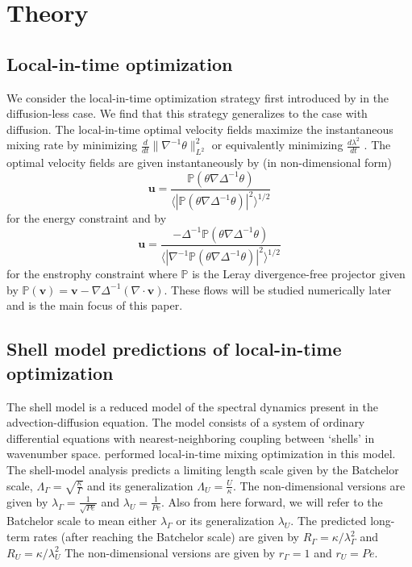 \documentclass[12pt]{iopart}
\newcommand{\ddt}[1]{\frac{d #1}{dt}}
\newcommand{\hmone}[1]{\|\nabla^{-1} #1\|_{L^{2}}}
\renewcommand{\vec}[1]{\mathbf{#1}}
\newcommand{\invlap}{\Delta^{-1}}
\begin{document}
\section{Theory}
\label{sec:theory}
\subsection{Local-in-time optimization}
We consider the local-in-time optimization strategy first introduced by \cite{JFM2011} in the diffusion-less case. We find that this strategy generalizes to the case with diffusion. The local-in-time optimal velocity fields maximize the instantaneous mixing rate by minimizing $\ddt{}\hmone{\theta}^2$ or equivalently minimizing $\ddt{\lambda^2}$ . The optimal velocity fields are given instantaneously by (in non-dimensional form)
%
\begin{equation}
\mathbf{u}= \frac{\mathds{P}(\theta \nabla \invlap\theta)}{\langle |\mathds{P}(\theta \nabla \invlap\theta)|^2\rangle^{1/2}}
\end{equation} 
%
for the energy constraint and by 
%
\begin{equation}
\mathbf{u}= \frac{-\invlap\mathds{P}(\theta \nabla \invlap\theta)}{\langle |\nabla^{-1}\mathds{P}(\theta \nabla \invlap\theta)|^2\rangle^{1/2}}
\end{equation}
%
for the enstrophy constraint where $\mathds{P}$ is the Leray divergence-free projector given by $\mathds{P}(\vec{v}) = \vec{v} - \nabla \Delta^{-1}(\nabla \cdot \vec{v})$. These flows will be studied numerically later and is the main focus of this paper.


\subsection{Shell model predictions of local-in-time optimization}

The shell model is a reduced model of the spectral dynamics present in the advection-diffusion equation. The model consists of a system of ordinary differential equations with nearest-neighboring coupling between `shells' in wavenumber space. \cite{Miles2017a} performed local-in-time mixing optimization in this model. The shell-model analysis predicts a limiting length scale given by the Batchelor scale, $\Lambda_{\Gamma} =\sqrt{\frac{\kappa}{\Gamma}}$  and its generalization $\Lambda_{U}= \frac{U}{\kappa} $. The non-dimensional versions are given by $\lambda_{\Gamma}= \frac{1}{\sqrt{Pe}}$ and $\lambda_{U} = \frac{1}{Pe}$.  Also from here forward, we will refer to the Batchelor scale to mean either $\lambda_{\Gamma}$ or its generalization $\lambda_{U}$.  The predicted long-term rates (after reaching the Batchelor scale) are given by $R_{\Gamma} =\kappa/\lambda_{\Gamma}^2 $  and  $R_{U}=\kappa/\lambda_{U}^2$  The non-dimensional versions are given by $r_{\Gamma} =1$ and $r_{U} = Pe $.
\end{document}
